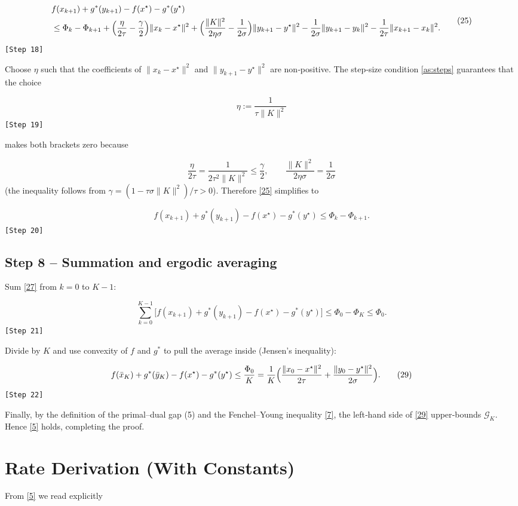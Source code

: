 \documentclass{article}
\begin{document}
\[
\begin{aligned}
&f(x_{k+1})+g^{*}(y_{k+1})-f(x^{\star})-g^{*}(y^{\star})
\\
&\le
\Phi_{k}-\Phi_{k+1}
+\Bigl(\frac{\eta}{2\tau}-\frac{\gamma}{2}\Bigr)\|x_{k}-x^{\star}\|^{2}
+\Bigl(\frac{\|K\|^{2}}{2\eta\sigma}-\frac{1}{2\sigma}\Bigr)\|y_{k+1}-y^{\star}\|^{2}
-\frac{1}{2\sigma}\|y_{k+1}-y_{k}\|^{2}
-\frac{1}{2\tau}\|x_{k+1}-x_{k}\|^{2}.
\end{aligned}
\tag{25}
\] 
\texttt{[Step 18]}

Choose $\eta$ such that the coefficients of $\|x_{k}-x^{\star}\|^{2}$ and $\|y_{k+1}-y^{\star}\|^{2}$ are non‑positive. The step‑size condition \eqref{as:steps} guarantees that the choice  

\[
\eta:=\frac{1}{\tau\|K\|^{2}}
\tag{26}
\] 
\texttt{[Step 19]}

makes both brackets zero because  

\[
\frac{\eta}{2\tau}
= \frac{1}{2\tau^{2}\|K\|^{2}}
\le \frac{\gamma}{2},
\qquad
\frac{\|K\|^{2}}{2\eta\sigma}
= \frac{1}{2\sigma}
\] 
(the inequality follows from $\gamma= (1-\tau\sigma\|K\|^{2})/\tau>0$).  
Therefore \eqref{25} simplifies to  

\[
f(x_{k+1})+g^{*}(y_{k+1})-f(x^{\star})-g^{*}(y^{\star})
\le
\Phi_{k}-\Phi_{k+1}.
\tag{27}
\] 
\texttt{[Step 20]}

\subsection*{Step 8 – Summation and ergodic averaging}
Sum \eqref{27} from $k=0$ to $K-1$:

\[
\sum_{k=0}^{K-1}\!\bigl[f(x_{k+1})+g^{*}(y_{k+1})-f(x^{\star})-g^{*}(y^{\star})\bigr]
\le
\Phi_{0}-\Phi_{K}
\le
\Phi_{0}.
\tag{28}
\] 
\texttt{[Step 21]}

Divide by $K$ and use convexity of $f$ and $g^{*}$ to pull the average inside (Jensen’s inequality):

\[
f(\bar x_{K})+g^{*}(\bar y_{K})-f(x^{\star})-g^{*}(y^{\star})
\le
\frac{\Phi_{0}}{K}
=
\frac{1}{K}\Bigl(\frac{\|x_{0}-x^{\star}\|^{2}}{2\tau}
+\frac{\|y_{0}-y^{\star}\|^{2}}{2\sigma}\Bigr).
\tag{29}
\] 
\texttt{[Step 22]}

Finally, by the definition of the primal–dual gap (5) and the Fenchel–Young inequality \eqref{7}, the left‑hand side of \eqref{29} upper‑bounds $\mathcal G_{K}$. Hence \eqref{5} holds, completing the proof. \hfill\qedsymbol

\section*{Rate Derivation (With Constants)}
From \eqref{5} we read explicitly  
\end{document}
